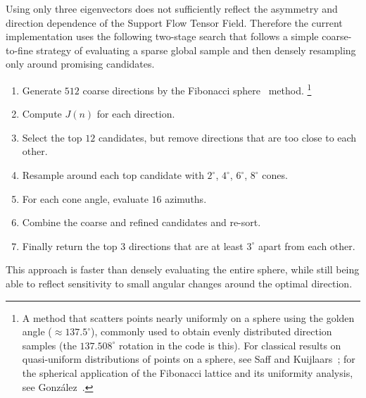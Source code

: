 \documentclass[11pt,a4paper]{article}
\begin{document}
Using only three eigenvectors does not sufficiently reflect the asymmetry and direction dependence of the Support Flow Tensor Field.
Therefore the current implementation uses the following two-stage search that follows a simple coarse-to-fine strategy
of evaluating a sparse global sample and then densely resampling only around promising candidates.

\begin{enumerate}
\item Generate $512$ coarse directions by the Fibonacci sphere~\cite{saff1997,gonzalez2010} method.%
\footnote{A method that scatters points nearly uniformly on a sphere using the golden angle ($\approx137.5^\circ$),
commonly used to obtain evenly distributed direction samples (the $137.508^\circ$ rotation in the code is this).
For classical results on quasi-uniform distributions of points on a sphere, see Saff and Kuijlaars~\cite{saff1997};
for the spherical application of the Fibonacci lattice and its uniformity analysis, see González~\cite{gonzalez2010}.}
\item Compute $J(n)$ for each direction.
\item Select the top $12$ candidates, but remove directions that are too close to each other.
\item Resample around each top candidate with $2^\circ$, $4^\circ$, $6^\circ$, $8^\circ$ cones.
\item For each cone angle, evaluate $16$ azimuths.
\item Combine the coarse and refined candidates and re-sort.
\item Finally return the top 3 directions that are at least $3^\circ$ apart from each other.
\end{enumerate}

This approach is faster than densely evaluating the entire sphere,
while still being able to reflect sensitivity to small angular changes around the optimal direction.
\end{document}
